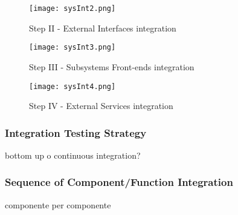 \FloatBarrier
\begin{figure}[!h]
	\centering
	\texttt{[image: sysInt2.png]}
	\caption{Step II - External Interfaces integration}
\end{figure}

\FloatBarrier

\vspace{20px}

\FloatBarrier
\begin{figure}[!h]
	\centering
	\texttt{[image: sysInt3.png]}
	\caption{Step III - Subsystems Front-ends integration}
\end{figure}

\FloatBarrier

\FloatBarrier
\begin{figure}[!h]
	\centering
	\texttt{[image: sysInt4.png]}
	\caption{Step IV - External Services integration}
\end{figure}

\FloatBarrier



\subsubsection{Integration Testing Strategy}
bottom up o continuous integration?

\subsubsection{Sequence of Component/Function Integration}

componente per componente
